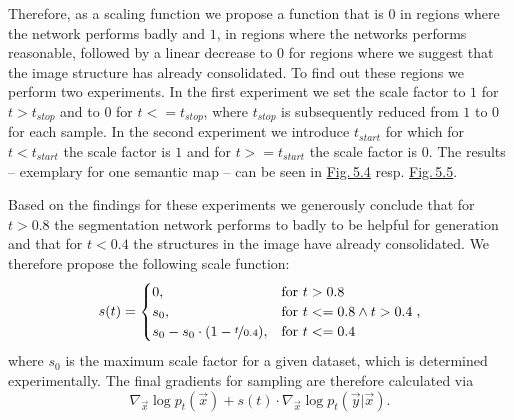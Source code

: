 Therefore, as a scaling function we propose a function that is $0$ in regions where the network performs badly and $1$, in regions where the networks performs reasonable, followed by a linear decrease to $0$ for regions where we suggest that the image structure has already consolidated. To find out these regions we perform two experiments. In the first experiment we set the scale factor to $1$ for $t>t_{stop}$ and to $0$ for $t<=t_{stop}$, where $t_{stop}$ is subsequently reduced from $1$ to $0$ for each sample. In the second experiment we introduce $t_{start}$ for which for $t<t_{start}$ the scale factor is $1$ and for $t>=t_{start}$ the scale factor is $0$. The results – exemplary for one semantic map – can be seen in \hyperref[fig:5.4]{Fig.\,5.4} resp. \hyperref[fig:5.5]{Fig.\,5.5}.

Based on the findings for these experiments we generously conclude that for $t>0.8$ the segmentation network performs to badly to be helpful for generation and that for $t<0.4$ the structures in the image have already consolidated. We therefore propose the following scale function:
%
\begin{equation}
    s(t)=\begin{cases}
        0, &\text{for }t>0.8\\
        s_0, &\text{for }t<=0.8 \land t>0.4\\
        s_0-s_0\cdot(1-\nicefrac{t}{0.4}), &\text{for }t<=0.4
    \end{cases},
\end{equation}
%
where $s_0$ is the maximum scale factor for a given dataset, which is determined experimentally. The final gradients for sampling are therefore calculated via
%
\begin{equation}
    \nabla_{\vec{x}}\log p_t(\vec{x})+s(t)\cdot\nabla_{\vec{x}}\log p_t(\vec{y}|\vec{x}).
\end{equation}
%
